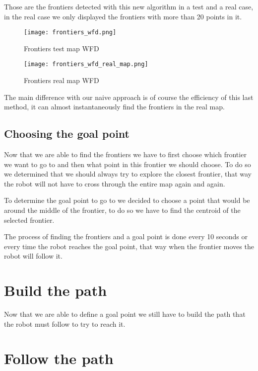 Those are the frontiers detected with this new algorithm in a test and a real case, in the real case we only displayed the frontiers with more than 20 points in it.

\FloatBarrier
\begin{figure}
    \centering\texttt{[image: frontiers\_wfd.png]}
    \label{fig:frontiers_wfd}
    \caption{Frontiers test map WFD}
\end{figure}
\FloatBarrier
\begin{figure}
    \centering\texttt{[image: frontiers\_wfd\_real\_map.png]}
    \label{fig:frontiers_wfd_real_map}
    \caption{Frontiers real map WFD}
\end{figure}
\FloatBarrier

The main difference with our naive approach is of course the efficiency of this last method, it can almost instantaneously find the frontiers in the real map.

\subsection{Choosing the goal point}

Now that we are able to find the frontiers we have to first choose which frontier we want to go to and then what point in this frontier we should choose.
To do so we determined that we should always try to explore the closest frontier, that way the robot will not have to cross through the entire map again and again.

To determine the goal point to go to we decided to choose a point that would be around the middle of the frontier, to do so we have to find the centroid of the selected frontier.

The process of finding the frontiers and a goal point is done every 10 seconds or every time the robot reaches the goal point, that way when the frontier moves the robot will follow it.

\section{Build the path}

Now that we are able to define a goal point we still have to build the path that the robot must follow to try to reach it.

\section{Follow the path}

